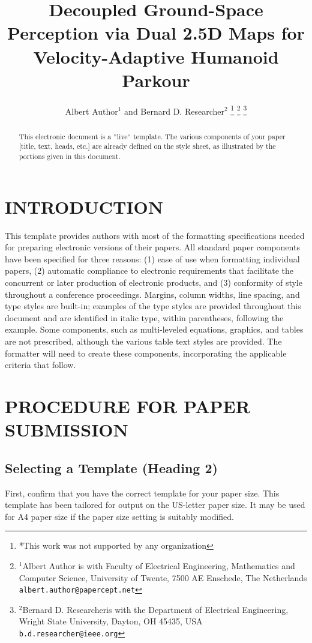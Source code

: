 \documentclass[letterpaper, 10 pt, conference]{ieeeconf}
\title{\LARGE \bf
Decoupled Ground-Space Perception via Dual 2.5D Maps for 
Velocity-Adaptive Humanoid Parkour
}
\author{Albert Author$^{1}$ and Bernard D. Researcher$^{2}$%
\thanks{*This work was not supported by any organization}%
\thanks{$^{1}$Albert Author is with Faculty of Electrical Engineering, Mathematics and Computer Science,
        University of Twente, 7500 AE Enschede, The Netherlands
        {\tt\small albert.author@papercept.net}}%
\thanks{$^{2}$Bernard D. Researcheris with the Department of Electrical Engineering, Wright State University,
        Dayton, OH 45435, USA
        {\tt\small b.d.researcher@ieee.org}}%
}
\begin{document}
\maketitle
\thispagestyle{empty}
\pagestyle{empty}


\begin{abstract}

This electronic document is a ``live`` template. The various components of your paper [title, text, heads, etc.] are already defined on the style sheet, as illustrated by the portions given in this document.

\end{abstract}


\section{INTRODUCTION}

This template provides authors with most of the formatting specifications needed for preparing electronic versions of their papers. All standard paper components have been specified for three reasons: (1) ease of use when formatting individual papers, (2) automatic compliance to electronic requirements that facilitate the concurrent or later production of electronic products, and (3) conformity of style throughout a conference proceedings. Margins, column widths, line spacing, and type styles are built-in; examples of the type styles are provided throughout this document and are identified in italic type, within parentheses, following the example. Some components, such as multi-leveled equations, graphics, and tables are not prescribed, although the various table text styles are provided. The formatter will need to create these components, incorporating the applicable criteria that follow.

\section{PROCEDURE FOR PAPER SUBMISSION}

\subsection{Selecting a Template (Heading 2)}

First, confirm that you have the correct template for your paper size. This template has been tailored for output on the US-letter paper size. 
It may be used for A4 paper size if the paper size setting is suitably modified.
\end{document}

